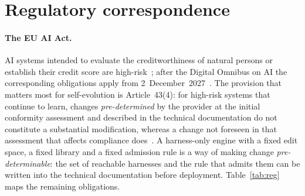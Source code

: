 \documentclass[11pt]{article}
\begin{document}
\section{Regulatory correspondence}
\label{sec:reg}

\paragraph{The EU AI Act.} AI systems intended to evaluate the creditworthiness of natural persons or establish their credit score are high-risk~\cite[Annex~III, point~5(b)]{euaiact}; after the Digital Omnibus on AI the corresponding obligations apply from 2~December~2027~\cite{omnibus}. The provision that matters most for self-evolution is Article~43(4): for high-risk systems that continue to learn, changes \emph{pre-determined} by the provider at the initial conformity assessment and described in the technical documentation do not constitute a substantial modification, whereas a change not foreseen in that assessment that affects compliance does~\cite[Arts.~3(23), 43(4)]{euaiact}. A harness-only engine with a fixed edit space, a fixed library and a fixed admission rule is a way of making change \emph{pre-determinable}: the set of reachable harnesses and the rule that admits them can be written into the technical documentation before deployment. Table~\ref{tab:reg} maps the remaining obligations.
\end{document}
